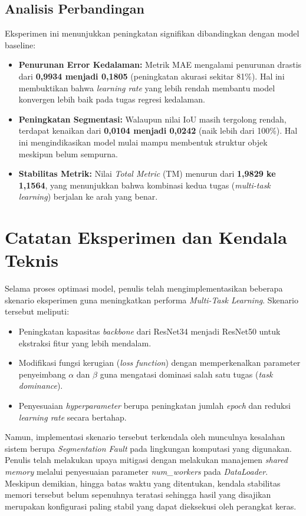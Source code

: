 \documentclass[12pt, a4paper]{article}
\begin{document}
\subsection{Analisis Perbandingan}
Eksperimen ini menunjukkan peningkatan signifikan dibandingkan dengan model baseline:
\begin{itemize}
    \item \textbf{Penurunan Error Kedalaman:} Metrik MAE mengalami penurunan drastis dari \textbf{0,9934 menjadi 0,1805} (peningkatan akurasi sekitar 81\%). Hal ini membuktikan bahwa \textit{learning rate} yang lebih rendah membantu model konvergen lebih baik pada tugas regresi kedalaman.
    \item \textbf{Peningkatan Segmentasi:} Walaupun nilai IoU masih tergolong rendah, terdapat kenaikan dari \textbf{0,0104 menjadi 0,0242} (naik lebih dari 100\%). Hal ini mengindikasikan model mulai mampu membentuk struktur objek meskipun belum sempurna.
    \item \textbf{Stabilitas Metrik:} Nilai \textit{Total Metric} (TM) menurun dari \textbf{1,9829 ke 1,1564}, yang menunjukkan bahwa kombinasi kedua tugas (\textit{multi-task learning}) berjalan ke arah yang benar.
\end{itemize}

\section{Catatan Eksperimen dan Kendala Teknis}

Selama proses optimasi model, penulis telah mengimplementasikan beberapa skenario eksperimen guna meningkatkan performa \textit{Multi-Task Learning}. Skenario tersebut meliputi:
\begin{itemize}
    \item Peningkatan kapasitas \textit{backbone} dari ResNet34 menjadi ResNet50 untuk ekstraksi fitur yang lebih mendalam.
    \item Modifikasi fungsi kerugian (\textit{loss function}) dengan memperkenalkan parameter penyeimbang $\alpha$ dan $\beta$ guna mengatasi dominasi salah satu tugas (\textit{task dominance}).
    \item Penyesuaian \textit{hyperparameter} berupa peningkatan jumlah \textit{epoch} dan reduksi \textit{learning rate} secara bertahap.
\end{itemize}

Namun, implementasi skenario tersebut terkendala oleh munculnya kesalahan sistem berupa \textit{Segmentation Fault} pada lingkungan komputasi yang digunakan. Penulis telah melakukan upaya mitigasi dengan melakukan manajemen \textit{shared memory} melalui penyesuaian parameter \textit{num\_workers} pada \textit{DataLoader}. Meskipun demikian, hingga batas waktu yang ditentukan, kendala stabilitas memori tersebut belum sepenuhnya teratasi sehingga hasil yang disajikan merupakan konfigurasi paling stabil yang dapat dieksekusi oleh perangkat keras.
\end{document}
